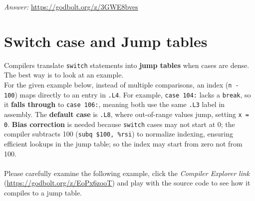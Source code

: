 \documentclass{article}
\begin{document}
\noindent\textit{Answer: }\url{https://godbolt.org/z/3GWE8bves} \\

\section{Switch case and Jump tables}
Compilers translate \texttt{switch} statements into \textbf{jump tables} when cases are dense. 
The best way is to look at an example. 
\\
For the given example below, instead of multiple comparisons, an index (\texttt{n - 100}) maps directly to an entry in \texttt{.L4}. For example, \texttt{case 104:} lacks a \texttt{break}, so it \textbf{falls through} to \texttt{case 106:}, meaning both use the same \texttt{.L3} label in assembly. The \textbf{default case} is \texttt{.L8}, where out-of-range values jump, setting \texttt{x = 0}. \textbf{Bias correction} is needed because \texttt{switch} cases may not start at 0; the compiler subtracts 100 (\texttt{subq \$100, \%rsi}) to normalize indexing, ensuring efficient lookups in the jump table; so the index may start from zero not from 100. \\
\\
Please carefully examine the following example, click the \textit{Compiler Explorer link }(\url{https://godbolt.org/z/EoPx6zooT}) and play with the source code to see how it compiles to a jump table. \\
\end{document}
